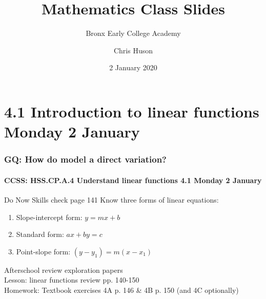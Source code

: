\documentclass{beamer}
\title{Mathematics Class Slides}
\subtitle{Bronx Early College Academy}
\author{Chris Huson}
\date{2 January 2020}
\begin{document}
\frame{\titlepage}
\section[Outline]{}
\frame{\tableofcontents}


\section{4.1 Introduction to linear functions Monday 2 January}
\frame
{
  \frametitle{GQ: How do model a direct variation?}
  \framesubtitle{CCSS: HSS.CP.A.4 Understand linear functions \hfill \alert{4.1 Monday 2 January}}

  \begin{block}{Do Now Skills check page 141}%
    Know three forms of linear equations:
  \begin{enumerate}
      \item Slope-intercept form: $y=mx+b$
      \item Standard form: $ax+by=c$
      \item Point-slope form: $(y-y_1)=m(x-x_1)$
  \end{enumerate}
  \end{block}
  Afterschool review exploration papers\\ \smallskip
  Lesson: linear functions review pp. 140-150 \\ \smallskip
  Homework: Textbook exercises 4A p. 146 \& 4B p. 150 (and 4C optionally)
}
\end{document}
